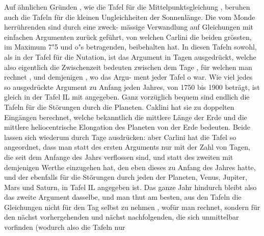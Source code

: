 \documentclass[12pt,a4paper]{article}
\begin{document}
Auf ähnlichen Gründen , wie die Tafel für die Mittelpunktsgleichung , beruhen auch die Tafeln\newline
für die kleinen Ungleichheiten der Sonnenlänge. Die vom Monde herrührenden sind durch eine zweck-\newline
mässige Verwandlung auf Gleichungen mit einfachen Argumenten zurück geführt, von welchen Carlini\newline
die beiden grössten, im Maximum 7"5 und o"s betragenden, beibehalten hat. In diesen Tafeln sowohl,\newline
als in der Tafel für die Nutation, ist das Argument in Tagen ausgedrückt, welche also eigentlich die\newline
Zwischenzeit bedeuten zwischen dem Tage , für welchen man rechnet , und demjenigen , wo das Argu-\newline
ment jeder Tafel o war. Wie viel jedes so ausgedrückte Argument zu Anfang jeden Jahres, von 1750\newline
bis 1900 beträgt, ist gleich in der Tafel IL mit angegeben.\newline
Ganz vorzüglich bequem sind endlich die Tafeln für die Störungen durch die Planeten. Caklini\newline
hat sie zu doppelten Eingängen berechnet, welche bekanntlich die mittlere Länge der Erde und die\newline
mittlere heliocentrische Elongation des Planeten von der Erde bedeuten. Beide lassen sich wiederum\newline
durch Tage ausdrücken: aber Carlini hat die Tafel so angeordnet, dass man statt des ersten Arguments\newline
nur mit der Zahl von Tagen, die seit dem Anfange des Jahrs verflossen sind, und statt des zweiten mit\newline
demjenigen Werthe einzugehen hat, den eben dieses zu Anfang des Jahres hatte, und der ebenfalls für\newline
die Störungen durch jeden der Planeten, Venus, Jupiter, Mars und Saturn, in Tafel IL angegeben ist.\newline
Das ganze Jahr hindurch bleibt also das zweite Argument dasselbe, und man thut am besten, aus den\newline
Tafeln die Gleichungen nicht für den Tag selbst zu nehmen , wofür man rechnet, sondern für den nächst\newline
vorhergehenden und nächst nachfolgenden, die sich unmittelbar vorfinden (wodurch also die Tafeln nur\newline
\end{document}
